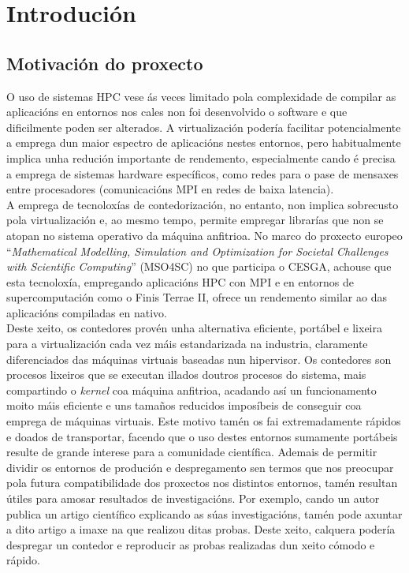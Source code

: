 \chapter{Introdución}
\minitoc
\clearpage


\section{Motivación do proxecto}

O uso de sistemas \gls{HPC} vese ás veces limitado pola complexidade de compilar as aplicacións en entornos nos cales non foi desenvolvido o software e que dificilmente poden ser alterados. A virtualización podería facilitar potencialmente a emprega dun maior espectro de aplicacións nestes entornos, pero habitualmente implica unha redución importante de rendemento, especialmente cando é precisa a emprega de sistemas hardware específicos, como redes para o pase de mensaxes entre procesadores (comunicacións \gls{MPI} en redes de baixa latencia).\\

A emprega de tecnoloxías de contedorización, no entanto, non implica sobrecusto pola virtualización e, ao mesmo tempo, permite empregar librarías que non se atopan no sistema operativo da máquina anfitrioa. No marco do proxecto europeo ``\textit{Mathematical Modelling, Simulation and Optimization for Societal Challenges with Scientific Computing}'' (MSO4SC) no que participa o \gls{CESGA}, achouse que esta tecnoloxía, empregando aplicacións \gls{HPC} con \gls{MPI} e en entornos de supercomputación como o Finis Terrae II, ofrece un rendemento similar ao das aplicacións compiladas en nativo.\\

Deste xeito, os contedores provén unha alternativa eficiente, portábel e lixeira para a virtualización cada vez máis estandarizada na industria, claramente diferenciados das máquinas virtuais baseadas nun hipervisor. Os contedores son procesos lixeiros que se executan illados doutros procesos do sistema, mais compartindo o \textit{kernel} coa máquina anfitrioa, acadando así un funcionamento moito máis eficiente e uns tamaños reducidos imposíbeis de conseguir coa emprega de máquinas virtuais. Este motivo tamén os fai extremadamente rápidos e doados de transportar, facendo que o uso destes entornos sumamente portábeis resulte de grande interese para a comunidade científica. Ademais de permitir dividir os entornos de produción e despregamento sen termos que nos preocupar pola futura compatibilidade dos proxectos nos distintos entornos, tamén resultan útiles para amosar resultados de investigacións. Por exemplo, cando un autor publica un artigo científico explicando as súas investigacións, tamén pode axuntar a dito artigo a imaxe na que realizou ditas probas. Deste xeito, calquera podería despregar un contedor e reproducir as probas realizadas dun xeito cómodo e rápido.\\

